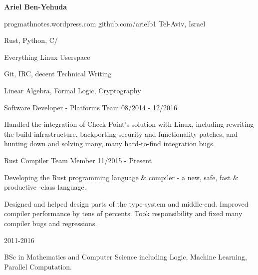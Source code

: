 \documentclass[11pt]{article} %
\begin{document}
\centerline{{\Huge \bf Ariel Ben-Yehuda}}
\bigskip

        {progmathnotes.wordpress.com}
        {github.com/arielb1}
        {Tel-Aviv, Israel}


      {Rust, Python, C/\CPP}

      {Everything Linux Userspace}

      {Git, IRC, decent Technical Writing}

      {Linear Algebra, Formal Logic, Cryptography}


\begin{description}
\squish
{}
           {Software Developer - Platforms Team}
           {08/2014 - 12/2016}

Handled the integration of Check Point's solution with Linux, including rewriting the build infrastructure, backporting security and functionality patches, and hunting down and solving many, many hard-to-find integration bugs.

           {Rust Compiler Team Member}
           {11/2015 - Present}

Developing the Rust programming language \& compiler - a new, safe, fast \& productive \CPP-class language.

Designed and helped design parts of the type-system and middle-end. Improved compiler performance by tens of percents. Took responsibility and fixed many compiler bugs and regressions.

\end{description}



\begin{description}
\squish
{}
           {}
           {2011-2016}

BSc in Mathematics and Computer Science including Logic, Machine Learning, Parallel Computation.

\end{description}


%
\end{document}
